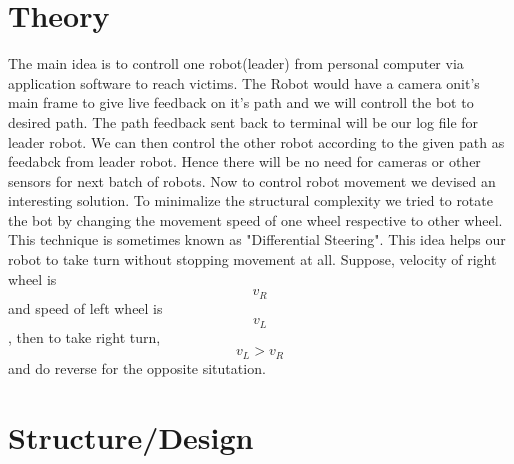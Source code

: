\documentclass{Resources/UoBLab1}
\begin{document}
\section{Theory}
The main idea is to controll one robot(leader) from personal computer via application software to reach victims. The Robot would have a camera onit's main frame to give live feedback on it's path  and we will controll the bot to desired path. The path feedback sent back to terminal will be our log file for leader robot. We can then control the other robot according to the given path as feedabck from leader robot. Hence there will be no need for cameras or other sensors for next batch of robots.\newline
Now to control robot movement we devised an interesting  solution. To minimalize the structural complexity we tried to rotate the bot by changing the movement speed of one wheel respective to other wheel. This technique is sometimes known as "Differential Steering".\newline
This idea helps our robot to take turn without stopping movement at all. \newline
Suppose, velocity of right wheel is \[ v_R\] and speed of left wheel is \[v_L\] , then  to take right turn,  \[v_L >  v_R\] and do reverse for the opposite situtation.


\section{Structure/Design}
\vspace{3mm}
\end{document}
